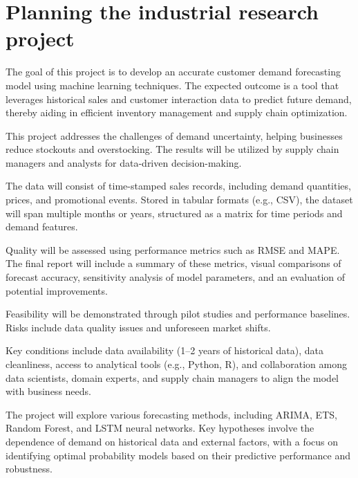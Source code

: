 \documentclass[12pt]{article}
\date{}
\begin{document}
\maketitle



\section{Planning the industrial research project}

The goal of this project is to develop an accurate customer demand forecasting model using machine learning techniques. The expected outcome is a tool that leverages historical sales and customer interaction data to predict future demand, thereby aiding in efficient inventory management and supply chain optimization.

This project addresses the challenges of demand uncertainty, helping businesses reduce stockouts and overstocking. The results will be utilized by supply chain managers and analysts for data-driven decision-making.

The data will consist of time-stamped sales records, including demand quantities, prices, and promotional events. Stored in tabular formats (e.g., CSV), the dataset will span multiple months or years, structured  as a matrix  for time periods and demand features.

Quality will be assessed using performance metrics such as RMSE and MAPE. The final report will include a summary of these metrics, visual comparisons of forecast accuracy, sensitivity analysis of model parameters, and an evaluation of potential improvements.

Feasibility will be demonstrated through pilot studies and performance baselines. Risks include data quality issues  and unforeseen market shifts. 

Key conditions include data availability (1–2 years of historical data), data cleanliness, access to analytical tools (e.g., Python, R), and collaboration among data scientists, domain experts, and supply chain managers to align the model with business needs.

The project will explore various forecasting methods, including ARIMA, ETS, Random Forest, and LSTM neural networks. Key hypotheses involve the dependence of demand on historical data and external factors, with a focus on identifying optimal probability models based on their predictive performance and robustness.
\end{document}
